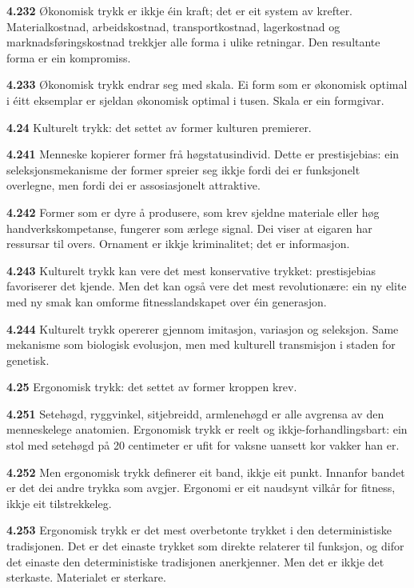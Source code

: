 \documentclass[11pt, a4paper]{article}
\newcommand{\subprop}[1]{\medskip\noindent\textbf{#1}\quad}
\begin{document}
\subprop{4.232} \O konomisk trykk er ikkje \'ein kraft; det er eit system av krefter. Materialkostnad, arbeidskostnad, transportkostnad, lagerkostnad og marknadsf\o ringskostnad trekkjer alle forma i ulike retningar. Den resultante forma er ein kompromiss.

\subprop{4.233} \O konomisk trykk endrar seg med skala. Ei form som er \o konomisk optimal i \'eitt eksemplar er sjeldan \o konomisk optimal i tusen. Skala er ein formgivar.

\subprop{4.24} Kulturelt trykk: det settet av former kulturen premierer.

\subprop{4.241} Menneske kopierer former fr\aa{} h\o gstatusindivid. Dette er prestisjebias: ein seleksjonsmekanisme der former spreier seg ikkje fordi dei er funksjonelt overlegne, men fordi dei er assosiasjonelt attraktive.

\subprop{4.242} Former som er dyre \aa{} produsere, som krev sjeldne materiale eller h\o g handverkskompetanse, fungerer som \ae rlege signal. Dei viser at eigaren har ressursar til overs. Ornament er ikkje kriminalitet; det er informasjon.

\subprop{4.243} Kulturelt trykk kan vere det mest konservative trykket: prestisjebias favoriserer det kjende. Men det kan ogs\aa{} vere det mest revolution\ae re: ein ny elite med ny smak kan omforme fitnesslandskapet over \'ein generasjon.

\subprop{4.244} Kulturelt trykk opererer gjennom imitasjon, variasjon og seleksjon. Same mekanisme som biologisk evolusjon, men med kulturell transmisjon i staden for genetisk.

\subprop{4.25} Ergonomisk trykk: det settet av former kroppen krev.

\subprop{4.251} Seteh\o gd, ryggvinkel, sitjebreidd, armleneh\o gd er alle avgrensa av den menneskelege anatomien. Ergonomisk trykk er reelt og ikkje-forhandlingsbart: ein stol med seteh\o gd p\aa{} 20 centimeter er ufit for vaksne uansett kor vakker han er.

\subprop{4.252} Men ergonomisk trykk definerer eit band, ikkje eit punkt. Innanfor bandet er det dei andre trykka som avgjer. Ergonomi er eit naudsynt vilk\aa r for fitness, ikkje eit tilstrekkeleg.

\subprop{4.253} Ergonomisk trykk er det mest overbetonte trykket i den deterministiske tradisjonen. Det er det einaste trykket som direkte relaterer til funksjon, og difor det einaste den deterministiske tradisjonen anerkjenner. Men det er ikkje det sterkaste. Materialet er sterkare.
\end{document}

